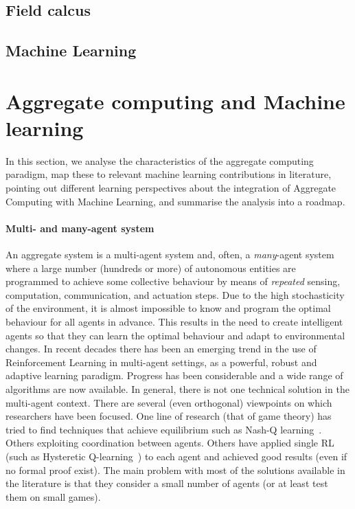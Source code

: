 \documentclass[
  twocolumn,
]{ceurart}
\begin{document}
\subsection{Field calcus}
\subsection{Machine Learning}

\section{Aggregate computing and Machine learning}

In this section,
 we analyse the characteristics of the aggregate computing paradigm,
 map these to relevant machine learning contributions in literature,
 pointing out different learning perspectives about the integration of Aggregate Computing with Machine Learning,
 and summarise the analysis into a roadmap.

\paragraph{Multi- and many-agent system}
%
An aggregate system is a multi-agent system
 and, often, a \emph{many}-agent system
 where a large number (hundreds or more)
 of autonomous entities are programmed to achieve 
 some collective behaviour by means of \emph{repeated} 
 sensing, computation, communication, and actuation steps.
%
Due to the high stochasticity of the environment,
 it is almost impossible to know and
 program the optimal behaviour for all agents in advance.
 This results in the need to create intelligent agents
 so that they can learn the optimal behaviour and adapt to environmental changes.
%
In recent decades there has been an emerging trend in the use of Reinforcement Learning
 in multi-agent settings, as a powerful, robust and adaptive learning paradigm.
 Progress has been considerable and a wide range of algorithms are now available.
In general, there is not one technical solution in the multi-agent context.
 There are several (even orthogonal) viewpoints on which researchers have been focused.
 One line of research (that of game theory) has tried to find techniques that achieve equilibrium such as Nash-Q learning~\cite{nash-q}.
 Others exploiting coordination between agents. 
 Others have applied single RL (such as Hysteretic Q-learning~\cite{hysteretic-q}) to each agent and achieved good results (even if no formal proof exist).
%
 The main problem with most of the solutions available in the literature is that they consider a small number of agents (or at least test them on small games).
\end{document}
